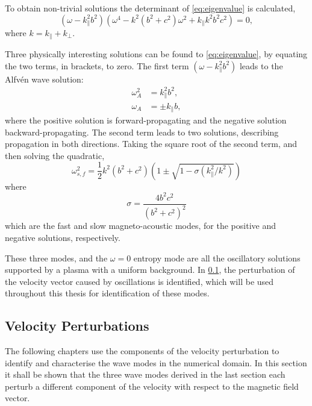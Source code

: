 To obtain non-trivial solutions the determinant of \cref{eq:eigenvalue} is calculated,
\begin{equation}
    (\omega - k_\parallel^2 b^2)\left( \omega^4 - k^2(b^2+c^2)\omega^2 + k_\parallel k^2b^2c^2 \right) = 0,
\end{equation}
where $k = k_\parallel + k_\perp$.

Three physically interesting solutions can be found to \cref{eq:eigenvalue}, by equating the two terms, in brackets, to zero.
The first term $(\omega - k_\parallel^2 b^2)$ leads to the Alfv\'en wave solution:
\begin{align}
\omega^2_A &= k^2_\parallel b^2,\\
\omega_A &= \pm k_\parallel b,
\label{eq:omegaA}
\end{align}
where the positive solution is forward-propagating and the negative solution backward-propagating.
The second term leads to two solutions, describing propagation in both directions. 
Taking the square root of the second term, and then solving the quadratic,
\begin{equation}
    \omega^2_{s,f} = \frac{1}{2}k^2(b^2+c^2)\left(1 \pm \sqrt{1 - \sigma (k^2_\parallel/k^2)}\right)
    \label{eq:omegasf}
\end{equation}
where
\begin{equation}
    \sigma=\frac{4b^2c^2}{(b^2 + c^2)^2}
    \label{eq:sigmasf}
\end{equation}
which are the fast and slow magneto-acoustic modes, for the positive and negative solutions, respectively.

These three modes, and the $\omega = 0$ entropy mode are all the oscillatory solutions supported by a plasma with a uniform background.
In \cref{sec:Vpert}, the perturbation of the velocity vector caused by oscillations is identified, which will be used throughout this thesis for identification of these modes.


\subsection{Velocity Perturbations}\label{sec:Vpert}

The following chapters use the components of the velocity perturbation to identify and characterise the wave modes in the numerical domain.
In this section it shall be shown that the three wave modes derived in the last section each perturb a different component of the velocity with respect to the magnetic field vector.

